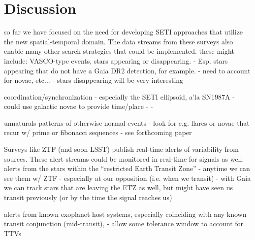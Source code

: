 \documentclass[twocolumn]{aastex62}
\begin{document}
\section{Discussion}
\label{sec:discussion}
%
%
%
%


so far we have focused on the need for developing SETI approaches that utilize the new spatial-temporal domain. The data streams from these surveys also enable many other search strategies that could be implemented. these might include:
VASCO-type events, stars appearing or disappearing. \citep{villarroel2016}
	- Esp. stars appearing that do not have a Gaia DR2 detection, for example.
	- need to account for novae, etc...
	- stars disappearing will be very interesting

coordination/synchronization \citep{makovetskii1977,shostak2004}
        - especially the SETI ellipsoid, a'la SN1987A \citep{lemarchand1994}
        - could use galactic novae to provide time/place
        - %
        - %

unnaturals patterns of otherwise normal events
	- look for e.g. flares or novae that recur w/ prime or fibonacci sequences
	- see forthcoming paper




Surveys like ZTF (and soon LSST) publish real-time alerts of variability from sources. These alert streams could be monitored in real-time for signals as well:
alerts from the stars within the ``restricted Earth Transit Zone'' \citep{heller2016}
	- anytime we can see them w/ ZTF
	- especially at our opposition (i.e. when we transit)
	- with Gaia we can track stars that are leaving the ETZ as well, but might 
	have seen us transit previously (or by the time the signal reaches us)

alerts from known exoplanet host systems, especially coinciding with any known transit conjunction (mid-transit), 
	- allow some tolerance window to account for TTVs
\end{document}
